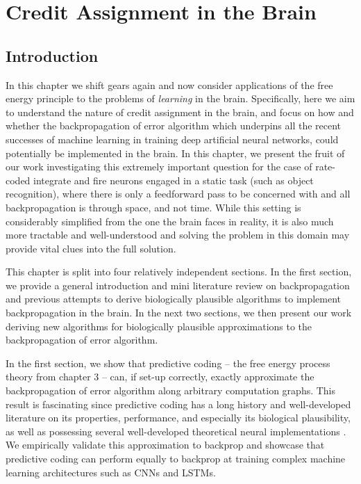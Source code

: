 \chapter{Credit Assignment in the Brain}

\section{Introduction}

In this chapter we shift gears again and now consider applications of the free energy principle to the problems of \emph{learning} in the brain. Specifically, here we aim to understand the nature of credit assignment in the brain, and focus on how and whether the backpropagation of error algorithm which underpins all the recent successes of machine learning in training deep artificial neural networks, could potentially be implemented in the brain. In this chapter, we present the fruit of our work investigating this extremely important question for the case of rate-coded integrate and fire neurons engaged in a static task (such as object recognition), where there is only a feedforward pass to be concerned with and all backpropagation is through space, and not time. While this setting is considerably simplified from the one the brain faces in reality, it is also much more tractable and well-understood and solving the problem in this domain may provide vital clues into the full solution. 

This chapter is split into four relatively independent sections. In the first section, we provide a general introduction and mini literature review on backpropagation and previous attempts to derive biologically plausible algorithms to implement backpropagation in the brain.  In the next two sections, we  then present our work deriving new algorithms for biologically plausible approximations to the backpropagation of error algorithm. 

In the first section, we show that predictive coding -- the free energy process theory from chapter 3 -- can, if set-up correctly, exactly approximate the backpropagation of error algorithm along arbitrary computation graphs. This result is fascinating since predictive coding has a long history and well-developed literature on its properties, performance, and especially its biological plausibility, as well as possessing several well-developed theoretical neural implementations \citep{bastos2012canonical,keller2018predictive,kanai2015cerebral}. We empirically validate this approximation to backprop and showcase that predictive coding can perform equally to backprop at training complex machine learning architectures such as CNNs and LSTMs. 


